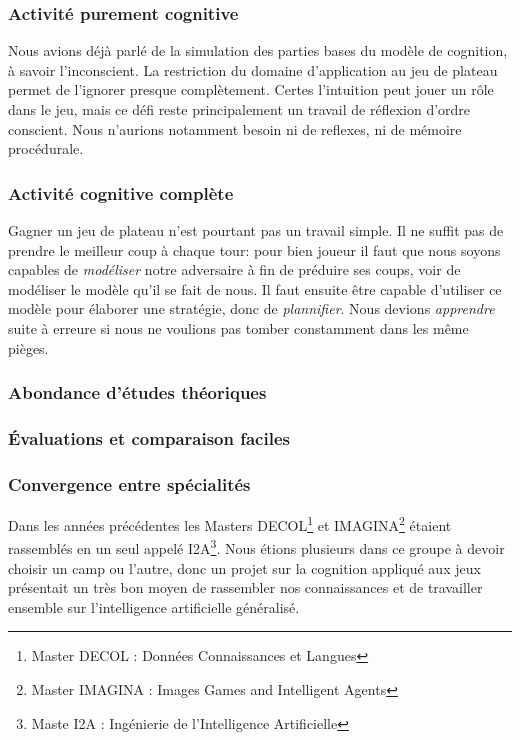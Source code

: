 \subsubsection{Activité purement cognitive}
Nous avions déjà parlé de la simulation des parties bases du modèle de cognition, à savoir l'inconscient. La restriction du domaine d'application au jeu de plateau permet de l'ignorer presque complètement. Certes l'intuition peut jouer un rôle dans le jeu, mais ce défi reste principalement un travail de réflexion d'ordre conscient. Nous n'aurions notamment besoin ni de reflexes, ni de mémoire procédurale.

\subsubsection{Activité cognitive complète}
Gagner un jeu de plateau n'est pourtant pas un travail simple. Il ne suffit pas de prendre le \og meilleur \fg{} coup à chaque tour: pour bien joueur il faut que nous soyons capables de \emph{modéliser} notre adversaire à fin de préduire ses coups, voir de modéliser le modèle qu'il se fait de nous. Il faut ensuite être capable d'utiliser ce modèle pour élaborer une stratégie, donc de \emph{plannifier}. Nous devions \emph{apprendre} suite à erreure si nous ne voulions pas tomber constamment dans les même pièges. 

\subsubsection{Abondance d'études théoriques}

\subsubsection{Évaluations et comparaison faciles}


\subsubsection{Convergence entre spécialités }
Dans les années précédentes les Masters DECOL\footnote{ Master DECOL : \og Données Connaissances et Langues \fg{} } et IMAGINA\footnote{ Master IMAGINA : \og Images Games and Intelligent Agents \fg{} } étaient rassemblés en un seul appelé I2A\footnote { Maste I2A : \og Ingénierie de l'Intelligence Artificielle \fg{} }.
Nous étions plusieurs dans ce groupe à devoir choisir un camp ou l'autre, donc un projet sur la cognition appliqué aux jeux présentait un très bon moyen de rassembler nos connaissances et de travailler ensemble sur l'intelligence artificielle généralisé.